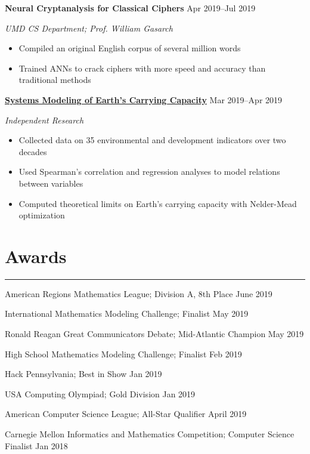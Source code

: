 \documentclass[11pt]{article}
\newcommand{\resumesection}[1]{\vspace{-0.3cm}\section*{\color{highlight}#1}\vspace{-0.3cm}\hrule\vspace{0.3cm}}
\begin{document}
\textbf{Neural Cryptanalysis for Classical Ciphers} \hfill Apr 2019--Jul 2019\par
\textit{UMD CS Department; Prof. William Gasarch}
\begin{itemize}
	\item Compiled an original English corpus of several million words
	\item Trained ANNs to crack ciphers with more speed and accuracy than traditional methods
\end{itemize}\vspace{0.1cm}

\textbf{\href{https://github.com/gautomdas/IMMC-World4}{Systems Modeling of Earth's Carrying Capacity}} \hfill Mar 2019--Apr 2019\par
\textit{Independent Research}
\begin{itemize}
	\item Collected data on 35 environmental and development indicators over two decades
	\item Used Spearman's correlation and regression analyses to model relations between variables
	\item Computed theoretical limits on Earth's carrying capacity with Nelder-Mead optimization
\end{itemize}\vspace{0.1cm}



\resumesection{Awards}

American Regions Mathematics League; Division A, 8th Place \hfill June 2019 \par
International Mathematics Modeling Challenge; Finalist \hfill May 2019\par
Ronald Reagan Great Communicators Debate; Mid-Atlantic Champion \hfill May 2019 \par
High School Mathematics Modeling Challenge; Finalist \hfill Feb 2019\par
Hack Pennsylvania; Best in Show \hfill Jan 2019\par
USA Computing Olympiad; Gold Division \hfill Jan 2019\par
American Computer Science League; All-Star Qualifier \hfill April 2019 \par 
Carnegie Mellon Informatics and Mathematics Competition; Computer Science Finalist \hfill Jan 2018\par
\end{document}

